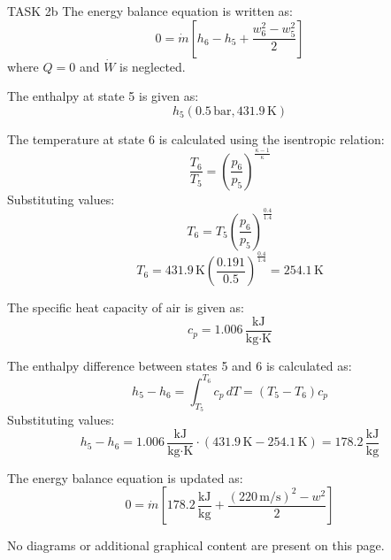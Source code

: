 TASK 2b  
The energy balance equation is written as:  
\[
0 = \dot{m} \left[ h_6 - h_5 + \frac{w_6^2 - w_5^2}{2} \right]
\]  
where \( Q = 0 \) and \( \dot{W} \) is neglected.

The enthalpy at state 5 is given as:  
\[
h_5 (0.5 \, \text{bar}, 431.9 \, \text{K})
\]  

The temperature at state 6 is calculated using the isentropic relation:  
\[
\frac{T_6}{T_5} = \left( \frac{p_6}{p_5} \right)^{\frac{\kappa - 1}{\kappa}}
\]  
Substituting values:  
\[
T_6 = T_5 \left( \frac{p_6}{p_5} \right)^{\frac{0.4}{1.4}}
\]  
\[
T_6 = 431.9 \, \text{K} \left( \frac{0.191}{0.5} \right)^{\frac{0.4}{1.4}} = 254.1 \, \text{K}
\]  

The specific heat capacity of air is given as:  
\[
c_p = 1.006 \, \frac{\text{kJ}}{\text{kg·K}}
\]  

The enthalpy difference between states 5 and 6 is calculated as:  
\[
h_5 - h_6 = \int_{T_5}^{T_6} c_p \, dT = (T_5 - T_6) c_p
\]  
Substituting values:  
\[
h_5 - h_6 = 1.006 \, \frac{\text{kJ}}{\text{kg·K}} \cdot (431.9 \, \text{K} - 254.1 \, \text{K}) = 178.2 \, \frac{\text{kJ}}{\text{kg}}
\]  

The energy balance equation is updated as:  
\[
0 = \dot{m} \left[ 178.2 \, \frac{\text{kJ}}{\text{kg}} + \frac{(220 \, \text{m/s})^2 - w^2}{2} \right]
\]  

No diagrams or additional graphical content are present on this page.